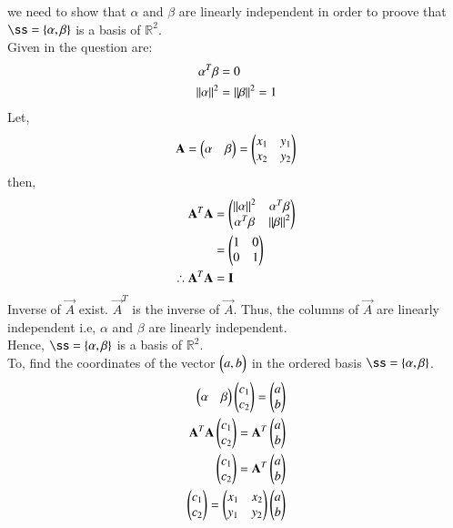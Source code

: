 we need to show that $\alpha$ and $\beta$ are linearly independent in order to proove that $\ss=\{\vec{\alpha},\vec{\beta}\}$ is a basis of $\mathbb{R}^2$.\\


Given in the question are:
\begin{align}
\alpha^T\beta&=0\label{eq:solutions/2/4/5/eq0}\\
\left\lVert\alpha\right\rVert^2 &=\left\lVert\beta\right\rVert^2=1 \label{eq:solutions/2/4/5/eq1}
\end{align}
Let,
\begin{align}
 \mathbf{A}=\begin{pmatrix}\alpha & \beta\end{pmatrix}=\begin{pmatrix}x_1&y_1\\x_2&y_2\end{pmatrix}
\end{align}
then,
\begin{align}
 \mathbf{A}^T\mathbf{A}&=\begin{pmatrix}\left\lVert\alpha\right\rVert^2 &\alpha^T\beta\\\alpha^T\beta&\left\lVert\beta\right\rVert^2\end{pmatrix}\\ &=\begin{pmatrix}1&0\\0&1\end{pmatrix}\\
 \therefore \mathbf{A}^T\mathbf{A}&=\mathbf{I}
\end{align}
Inverse of $\vec{A}$ exist. $\vec{A}^T$ is the inverse of $\vec{A}$. 
Thus, the columns of $\vec{A}$ are linearly independent i.e, $\alpha$ and $\beta$ are linearly independent. \\
Hence, $\ss=\{\vec{\alpha},\vec{\beta}\}$ is a basis of $\mathbb{R}^2$.\\



To, find the coordinates of the vector $\begin{pmatrix}a,b\end{pmatrix}$ in the ordered basis $\ss=\{\vec{\alpha},\vec{\beta}\}$. 
   \begin{align}
   \begin{pmatrix}\alpha&\beta\end{pmatrix}\begin{pmatrix}c_1\\c_2\end{pmatrix}=\begin{pmatrix}a\\b\end{pmatrix}\\
\mathbf{A}^T\mathbf{A}\begin{pmatrix}c_1\\c_2\end{pmatrix}=\mathbf{A}^T\begin{pmatrix}a\\b\end{pmatrix}\\
\begin{pmatrix}c_1\\c_2\end{pmatrix}=\mathbf{A}^T\begin{pmatrix}a\\b\end{pmatrix}\\
\begin{pmatrix}c_1\\c_2\end{pmatrix}=\begin{pmatrix}x_1&x_2\\y_1&y_2\end{pmatrix}\begin{pmatrix}a\\b\end{pmatrix}
\end{align}
 
